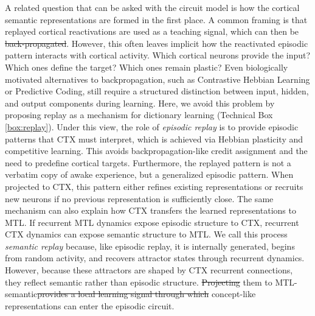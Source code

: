 \documentclass{article}
\providecommand{\DIFaddtex}[1]{{\protect\color{blue}\uwave{#1}}} %
\providecommand{\DIFdeltex}[1]{{\protect\color{red}\sout{#1}}}                      %
\providecommand{\DIFaddbegin}{} %
\providecommand{\DIFaddend}{} %
\providecommand{\DIFdelbegin}{} %
\providecommand{\DIFdelend}{} %
\providecommand{\DIFadd}[1]{\texorpdfstring{\DIFaddtex{#1}}{#1}} %
\providecommand{\DIFdel}[1]{\texorpdfstring{\DIFdeltex{#1}}{}} %
\begin{document}
\newline\newline
A related question that can be asked with the circuit model is how the cortical semantic representations are formed in the first place. A common framing is that replayed cortical reactivations are used as a teaching signal, which can then be \DIFdelbegin \DIFdel{back-propagated}\DIFdelend \DIFaddbegin \DIFadd{backpropagated}\DIFaddend . However, this often leaves implicit how the reactivated episodic pattern interacts with cortical activity. Which cortical neurons provide the input? Which ones define the target? Which ones remain plastic? Even biologically motivated alternatives to backpropagation, such as Contrastive Hebbian Learning or Predictive Coding, still require a structured distinction between input, hidden, and output components during learning.
\newline\newline
Here, we avoid this problem by proposing replay as a mechanism for dictionary learning (Technical Box \ref{box:replay}). Under this view, the role of \textit{episodic replay} is to provide episodic patterns that CTX must interpret, which is achieved via Hebbian plasticity and competitive learning. This avoids backpropagation-like credit assignment and the need to predefine cortical targets. Furthermore, the replayed pattern is not a verbatim copy of awake experience, but a generalized episodic pattern. When projected to CTX, this pattern either refines existing representations or recruits new neurons if no previous representation is sufficiently close.
\newline\newline
The same mechanism can also explain how CTX transfers the learned representations to MTL. If recurrent MTL dynamics expose episodic structure to CTX, recurrent CTX dynamics can expose semantic structure to MTL. We call this process \textit{semantic replay} because, like episodic replay, it is internally generated, begins from random activity, and recovers attractor states through recurrent dynamics. However, because these attractors are shaped by CTX recurrent connections, they reflect semantic rather than episodic structure. \DIFdelbegin \DIFdel{Projecting }\DIFdelend \DIFaddbegin \DIFadd{By projecting }\DIFaddend them to MTL-semantic\DIFdelbegin \DIFdel{provides a local learning signal through which }\DIFdelend \DIFaddbegin \DIFadd{, }\DIFaddend concept-like representations can enter the episodic circuit.
\newline\newline
\end{document}
